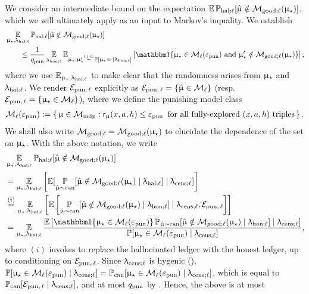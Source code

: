 We consider an intermediate bound on the expectation $\Expop\Prhall[\modvarhat \notin \modgoodl(\modst)] $, which we will ultimately apply as an input to Markov's inquality. We establish
\begin{align}
&\Expop_{\modst,\ledhall}\Prhall[\modvarhat \notin \modgoodl(\modst)] \nonumber\\
&\qquad\le \frac{1}{\qpunish} \Expop_{\ledhonl}\Exp_{\modst, \modst' \iidsim  \Pr[\modst = \cdot \mid \ledhonl] } \left[\ind\{\modst \in \modclass_{\ell}(\epspunish) \text{ and } \modst' \notin \modgoodl(\modst) \}\right] \label{eq:expop},
\end{align}
where we use $\Expop_{\modst,\ledhall}$ to make clear that the randomness arises from $\upmu_{\star}$ and $\uplambda_{\mathrm{hal};\ell}$. We render $\mathcal{E}_{\mathrm{pun},\,\ell}$ explicitly as $\mathcal{E}_{\mathrm{pun},\,\ell} = \{\hat{\upmu} \in \mathcal{M}_{\ell}\}$ (resp. $\mathcal{E}_{\mathrm{pun},\,\ell} = \{\upmu_{\star} \in \mathcal{M}_{\ell}\}$), where we define the punishing model class
\begin{align}\label{eq:modclass_hall}
\mathcal{M}_{\ell}(\varepsilon_{\mathrm{pun}}) :=
    \left\{\, \upmu \in \mathcal{M}_{\mathrm{mdp}}:
    \mathsf{r}_{\upmu}(x,a,h) \le \varepsilon_{\mathrm{pun}}
    \;\;\text{for all fully-explored $(x,a,h)$ triples}
    \,\right\}.
\end{align}
We shall also write $\mathcal{M}_{\mathrm{good};\ell} = \mathcal{M}_{\mathrm{good};\ell}(\upmu_{\star})$ to elucidate the dependence of the set on $\upmu_{\star}$.
With the above notation, we write
\begin{align*}
&\Expop_{\modst,\ledhall}\Prhall[\modvarhat \notin \modgoodl(\modst)]  \\
&= \Expop_{\modst,\ledhall}\left[\Exp[\Prmucan[\modvarhat \notin \modgoodl(\modst) \mid \ledhall] \mid \ledcensl]\right]\\
&\overset{(i)}{=}\Expop_{\modst,\ledhall}\left[\Exp\left[\Prmucan[\modvarhat \notin \modgoodl(\modst) \mid \ledhonl] \mid \ledcensl, \EvPun\right]\right]\\
&= \Expop_{\modst,\ledhall}\frac{\Expop \left[\ind\{\modst \in \modclass_{\ell}(\epspunish)\}\Prmucan[\modvarhat \notin \modgoodl(\modst)\mid \ledhonl] \mid \ledcensl\right]}{\Pr[\modst \in \modclass_{\ell}(\epspunish) \mid \ledcensl]},
\end{align*}
where $(i)$ invokes  to replace the hallucinated ledger with the honest ledger, up to conditioning on $\mathcal{E}_{\mathrm{pun},\,\ell}$.
Since $\uplambda_{\mathrm{cens};\ell}$ is hygenic (),  $\operatorname{\mathbb{P}}[\upmu_{\star} \in \mathcal{M}_{\ell}(\varepsilon_{\mathrm{pun}}) \mid \uplambda_{\mathrm{cens};\ell}] = \operatorname{\mathbb{P}}_{\mathrm{can}}[\upmu_{\star} \in \mathcal{M}_{\ell}(\varepsilon_{\mathrm{pun}}) \mid \uplambda_{\mathrm{cens};\ell}]$, which is equal to $\operatorname{\mathbb{P}}_{\mathrm{can}}[\mathcal{E}_{\mathrm{pun},\,\ell} \mid \uplambda_{\mathrm{cens};\ell}]$, and at most $q_{\mathrm{pun}}$ by . Hence, the above is at most
